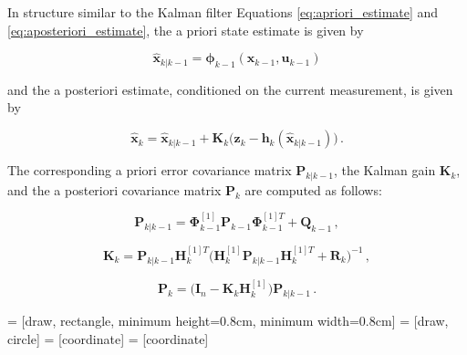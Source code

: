 In structure similar to the Kalman filter Equations \ref{eq:apriori_estimate} and \ref{eq:aposteriori_estimate}, the a priori state estimate is given by

\begin{equation}\label{eq:apriori_estimate_extended}
  \hat{\bm{x}}_{k|k-1} = \bm{\phi}_{k-1}(\bm{x}_{k-1}, \bm{u}_{k-1})
\end{equation}

\noindent
and the a posteriori estimate, conditioned on the current measurement, is given by

\begin{equation}\label{eq:aposteriori_estimate_extended}
  \hat{\bm{x}}_k = \hat{\bm{x}}_{k|k-1} + \bm{K}_{k}\big(\bm{z}_k-\bm{h}_k(\hat{\bm{x}}_{k|k-1})\big)\,.
\end{equation}

\noindent
The corresponding a priori error covariance matrix $\bm{P}_{k|k-1}$, the Kalman gain $\bm{K}_{k}$, and the a posteriori covariance matrix $\bm{P}_{k}$ are computed as follows:

\begin{equation}\label{eq:apriori_error_cov_extended}
  \bm{P}_{k|k-1} = \bm{\Phi}^{[1]}_{k-1} \bm{P}_{k-1} \bm{\Phi}^{[1]T}_{k-1} + \bm{Q}_{k-1}\,,
\end{equation}

\begin{equation}\label{eq:Kalman_gain_extended}
  \bm{K}_{k} = \bm{P}_{k|k-1} \bm{H}^{[1]T}_k \big(\bm{H}^{[1]}_k \bm{P}_{k|k-1} \bm{H}^{[1]T}_k + \bm{R}_k \big)^{-1}\,,
\end{equation}

\begin{equation}\label{eq:aposteriori_error_cov_extended}
  \bm{P}_{k} = \big(\bm{I}_n - \bm{K}_{k}\bm{H}^{[1]}_{k}\big)\bm{P}_{k|k-1}\,.
\end{equation}

 = [draw, rectangle, minimum height=0.8cm, minimum width=0.8cm]
 = [draw, circle]
 = [coordinate]
 = [coordinate]

